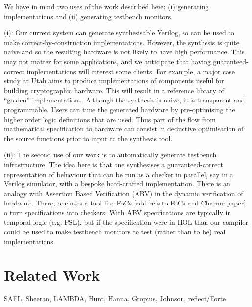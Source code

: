 \documentclass{llncs}
\begin{document}
We have in mind two uses of the work described here: (i) generating
implementations and (ii) generating testbench monitors.

(i): Our current system can generate synthesisable Verilog, so can be
used to make correct-by-construction implementations. However, the
synthesis is quite naive and so the resulting hardware is not likely
to have high performance. This may not matter for some applications,
and we anticipate that having guaranteed-correct implementations will
interest some clients. For example, a major case study at Utah aims to
produce implementations of components useful for building
cryptographic hardware.  This will result in a reference library of ``golden''
implementations. Although the synthesis is naive, it is transparent
and programmable. Users can tune the generated hardware by
pre-optimising the higher order logic definitions that are used. Thus
part of the flow from mathematical specification to hardware can
consist in deductive optimisation of the source functions prior to
input to the synthesis tool.

(ii): The second use of our work is to automatically generate testbench
infrastructure. The idea here is that one synthesises a
guaranteed-correct representation of behaviour that can be run as a checker in
parallel, say in a Verilog simulator, with a bespoke hard-crafted
implementation. There is an analogy with
Assertion Based Verification (ABV) in the dynamic verification of
hardware. There, one uses a tool like FoCs [add refs to FoCs and Charme paper] 
o turn specifications into checkers.  With ABV specifications
are typically in temporal logic (e.g.{} PSL), but if the specification
were in HOL than our compiler could be used to make
testbench monitors to test (rather than to be) real implementations.



\section{Related Work}
\label{secRelatedWork}

SAFL, Sheeran, LAMBDA, Hunt, Hanna, Gropius, Johnson, reflect/Forte





\end{document}
